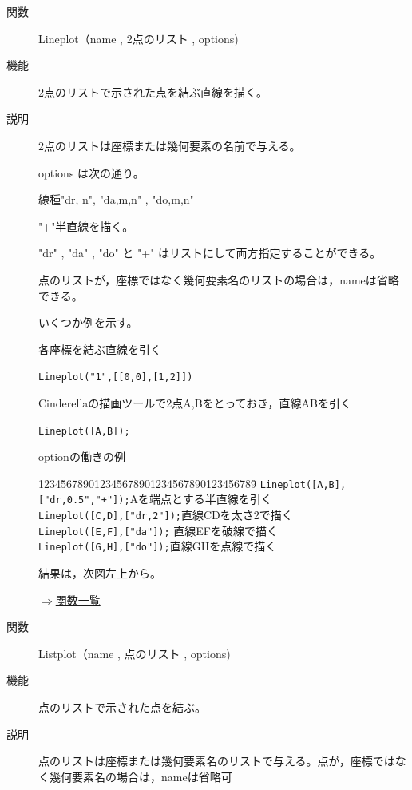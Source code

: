 \documentclass[papersize,a4paper,10pt,uplatex]{jsarticle}
\begin{document}
\begin{description}
\vspace{35mm}

\vspace{\baselineskip}
\hypertarget{lineplot}{}
\item[関数]Lineplot（name , 2点のリスト , options)
\item[機能]2点のリストで示された点を結ぶ直線を描く。
\item[説明]2点のリストは座標または幾何要素の名前で与える。

options は次の通り。

線種"dr, n", "da,m,n" , "do,m,n"

 "+"半直線を描く。

"dr" , "da" , "do" と "+" はリストにして両方指定することができる。

点のリストが，座標ではなく幾何要素名のリストの場合は，nameは省略できる。

いくつか例を示す。

\vspace{\baselineskip}
各座標を結ぶ直線を引く

\hspace{5mm} \verb|Lineplot("1",[[0,0],[1,2]])|

Cinderellaの描画ツールで2点A,Bをとっておき，直線ABを引く

\hspace{5mm} \verb|Lineplot([A,B]);| 

optionの働きの例
\begin{tabbing}
1234\=56789012345678901234567890123456789\=\kill
 \> \verb|Lineplot([A,B],["dr,0.5","+"]);|\>Aを端点とする半直線を引く\\
 \> \verb|Lineplot([C,D],["dr,2"]);|\>直線CDを太さ2で描く\\
 \> \verb|Lineplot([E,F],["da"]);| \>直線EFを破線で描く\\
 \> \verb|Lineplot([G,H],["do"]);|\>直線GHを点線で描く
\end{tabbing}
結果は，次図左上から。

\vspace{\baselineskip}
\hspace{20mm} 

\begin{flushright}\hyperlink{functionlist}{$\Rightarrow$関数一覧}\end{flushright}

\vspace{\baselineskip}
\hypertarget{listplot}{}
\item[関数]Listplot（name , 点のリスト , options)
\item[機能]点のリストで示された点を結ぶ。
\item[説明]点のリストは座標または幾何要素名のリストで与える。点が，座標ではなく幾何要素名の場合は，nameは省略可 


\end{description}
\end{document}
